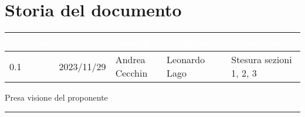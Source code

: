 \section{Storia del documento} \label{sec:storia}
\begingroup
\setlength{\tabcolsep}{10pt}
\renewcommand{\arraystretch}{1.5}
\begin{tabularx}{\textwidth}{| l | l | X | X | X |}
    \hline
    \rowcolor{headerrow} \textbf{\textcolor{white}{Versione}} & \textbf{\textcolor{white}{Data}} & \textbf{\textcolor{white}{Autori}} & \textbf{\textcolor{white}{Verificatori}} & \textbf{\textcolor{white}{Descrizione}} \\
    \hline
    0.1 & 2023/11/29 & Andrea Cecchin & Leonardo Lago & Stesura sezioni 1, 2, 3\\
    \hline
\end{tabularx}
\endgroup
\begin{flushright}
\vspace{15pt}
Presa visione del proponente\\
\vspace{38pt}
\rule[10pt]{148pt}{0.4pt}
\end{flushright}